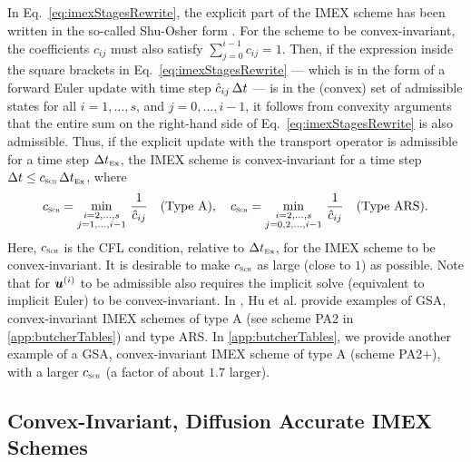In Eq.~\eqref{eq:imexStagesRewrite}, the explicit part of the IMEX scheme has been written in the so-called Shu-Osher form \cite{shuOsher_1988}.  
For the scheme to be convex-invariant, the coefficients $c_{ij}$ must also satisfy $\sum_{j=0}^{i-1}c_{ij}=1$.  
Then, if the expression inside the square brackets in Eq.~\eqref{eq:imexStagesRewrite} --- which is in the form of a forward Euler update with time step $\hat{c}_{ij}\,\Delta t$ --- is in the (convex) set of admissible states for all $i=1,\ldots,s$, and $j=0,\ldots,i-1$, it follows from convexity arguments that the entire sum on the right-hand side of Eq.~\eqref{eq:imexStagesRewrite} is also admissible.  
Thus, if the explicit update with the transport operator is admissible for a time step $\Delta t_{\mbox{\tiny Ex}}$, the IMEX scheme is convex-invariant for a time step $\Delta t\le c_{\textnormal{\tiny\textsc{Sch}}}\,\Delta t_{\mbox{\tiny Ex}}$, where
\begin{equation}
  c_{\textnormal{\tiny\textsc{Sch}}}=\min_{\substack{i = 2,\ldots,s \\ 
       j = 1,\ldots,i-1}}\,\frac{1}{\hat{c}_{ij}} \quad \text{(Type A)}, \quad  c_{\textnormal{\tiny\textsc{Sch}}}=\min_{\substack{i = 2,\ldots,s \\ 
              j = 0,2,\ldots,i-1}}\,\frac{1}{\hat{c}_{ij}} \quad \text{(Type ARS)}.
  \label{eq:imexCFL}
\end{equation}
Here, $c_{\textnormal{\tiny\textsc{Sch}}}$ is the CFL condition, relative to $\Delta t_{\mbox{\tiny Ex}}$, for the IMEX scheme to be convex-invariant.  
It is desirable to make $c_{\textnormal{\tiny\textsc{Sch}}}$ as large (close to $1$) as possible.  
Note that for $\boldsymbol{u}^{(i)}$ to be admissible also requires the implicit solve (equivalent to implicit Euler) to be convex-invariant.  
In \cite{hu_etal_2018}, Hu et al. provide examples of GSA, convex-invariant IMEX schemes of type A (see scheme PA2 in \ref{app:butcherTables}) and type ARS.  
In \ref{app:butcherTables}, we provide another example of a GSA, convex-invariant IMEX scheme of type A (scheme PA2+), with a larger $c_{\textnormal{\tiny\textsc{Sch}}}$ (a factor of about $1.7$ larger).  

\subsection{Convex-Invariant, Diffusion Accurate IMEX Schemes}

